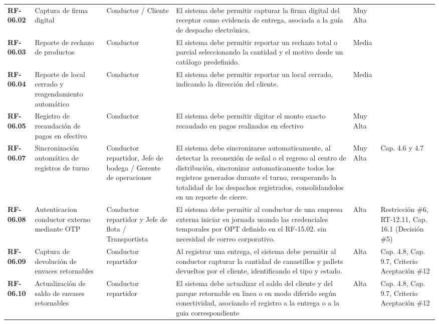 \begin{longtable}{p{1.7cm} p{2.3cm} p{1.9cm} p{5.0cm} p{1.1cm} p{1.9cm}}
\textbf{RF-06.02} & Captura de firma digital & Conductor / Cliente & El sistema debe permitir capturar la firma digital del receptor como evidencia de entrega, asociada a la guía de despacho electrónica. & Muy Alta &  \\
\textbf{RF-06.03} & Reporte de rechazo de productos & Conductor & El sistema debe permitir reportar un rechazo total o parcial seleccionando la cantidad y el motivo desde un catálogo predefinido. & Media &  \\
\textbf{RF-06.04} & Reporte de local cerrado y reagendamiento automático & Conductor & El sistema debe permitir reportar un local cerrado, indicando la dirección del cliente. & Media &  \\
\textbf{RF-06.05} & Registro de recaudación de pagos en efectivo & Conductor & El sistema debe permitir digitar el monto exacto recaudado en pagos realizados en efectivo & Muy Alta &  \\
\textbf{RF-06.07} & Sincronización automática de registros de turno & Conductor repartidor, Jefe de bodega / Gerente de operaciones & El sistema debe sincronizarse automaticamente, al detectar la reconexión de señal o el regreso al centro de distribución, sincronizar automaticamente todos los registros generados durante el turno, recuperando la totalidad de los despachos registrados, consolidandolos en un reporte de cierre. & Muy Alta & Cap. 4.6 y 4.7 \\
\textbf{RF-06.08} & Autenticacion conductor externo mediante OTP & Conductor repartidor y Jefe de flota / Transportista & El sistema debe permitir al conductor de una empresa externa iniciar su jornada usando las credenciales temporales por OPT definido en el RF-15.02. sin necesidad de correo corporativo. & Alta & Restricción \#6, RT-12.11, Cap. 16.1 (Decisión \#5) \\
\textbf{RF-06.09} & Captura de devolución de envaces retornables & Conductor repartidor & Al registrar una entrega, el sistema debe permitir al conductor capturar la cantidad de canastillos y pallets devueltos por el cliente, identificando el tipo y estado. & Alta & Cap. 4.8, Cap. 9.7, Criterio Aceptación \#12 \\
\textbf{RF-06.10} & Actualización de saldo de envases retornables & Conductor repartidor & El sistema debe actualizar el saldo del cliente y del parque retornable en linea o en modo diferido según conectividad, asociando el registro a la entrega o a la guia correspondiente & Alta & Cap. 4.8, Cap. 9.7, Criterio Aceptación \#12 \\

\end{longtable}
